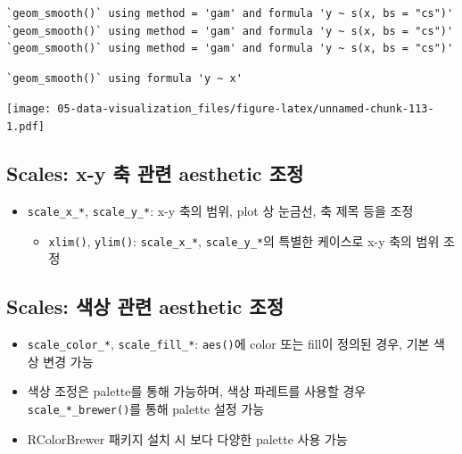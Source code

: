 \documentclass[
  11pt,
]{krantz}
\providecommand{\tightlist}{%
  \setlength{\itemsep}{0pt}\setlength{\parskip}{0pt}}
\begin{document}
\normalsize

\footnotesize

\begin{verbatim}
`geom_smooth()` using method = 'gam' and formula 'y ~ s(x, bs = "cs")'
`geom_smooth()` using method = 'gam' and formula 'y ~ s(x, bs = "cs")'
`geom_smooth()` using method = 'gam' and formula 'y ~ s(x, bs = "cs")'
\end{verbatim}

\begin{verbatim}
`geom_smooth()` using formula 'y ~ x'
\end{verbatim}

\texttt{[image: 05-data-visualization\_files/figure-latex/unnamed-chunk-113-1.pdf]}

\normalsize

\hypertarget{scale-x-y}{%
\subsection{Scales: x-y 축 관련 aesthetic 조정}\label{scale-x-y}}

\begin{itemize}
\tightlist
\item
  \texttt{scale\_x\_*}, \texttt{scale\_y\_*}: x-y 축의 범위, plot 상 눈금선, 축 제목 등을 조정

  \begin{itemize}
  \tightlist
  \item
    \texttt{xlim()}, \texttt{ylim()}: \texttt{scale\_x\_*}, \texttt{scale\_y\_*}의 특별한 케이스로 x-y 축의 범위 조정
  \end{itemize}
\end{itemize}

\hypertarget{scale-colors-fill}{%
\subsection{Scales: 색상 관련 aesthetic 조정}\label{scale-colors-fill}}

\begin{itemize}
\tightlist
\item
  \texttt{scale\_color\_*}, \texttt{scale\_fill\_*}: \texttt{aes()}에 color 또는 fill이 정의된 경우, 기본 색상 변경 가능
\item
  색상 조정은 palette를 통해 가능하며, 색상 파레트를 사용할 경우 \texttt{scale\_*\_brewer()}를 통해 palette 설정 가능
\item
  RColorBrewer 패키지 설치 시 보다 다양한 palette 사용 가능
\end{itemize}
\end{document}
